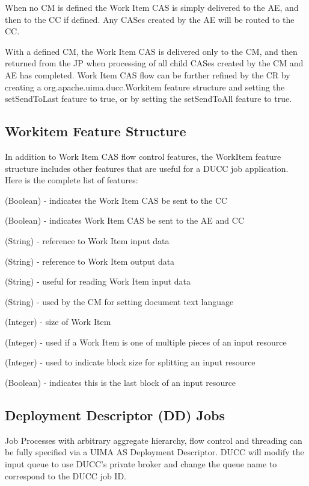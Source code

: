 When no CM is defined the Work Item CAS is simply delivered to the AE, and then to the CC if defined. 
Any CASes created by the AE will be routed to the CC.

With a defined CM, the Work Item CAS is delivered only to the CM, and then returned from the JP when processing
of all child CASes created by the CM and AE has completed. Work Item CAS flow can be further refined by the CR by
creating a org.apache.uima.ducc.Workitem feature structure and setting the setSendToLast feature to true,
or by setting the setSendToAll feature to true.

\subsection{Workitem Feature Structure}
In addition to Work Item CAS flow control features, the WorkItem feature structure includes other features that are useful
for a DUCC job application. Here is the complete list of features:

\begin{description}[labelindent=0.5in,leftmargin=0.5in]
  \item[sendToLast] (Boolean) - indicates the Work Item CAS be sent to the CC
  \item[sendToAll] (Boolean) - indicates Work Item CAS be sent to the AE and CC
  \item[inputspec] (String) - reference to Work Item input data
  \item[outputspec] (String) - reference to Work Item output data
  \item[encoding] (String) - useful for reading Work Item input data
  \item[language] (String) - used by the CM for setting document text language
  \item[bytelength] (Integer) - size of Work Item
  \item[blockindex] (Integer) - used if a Work Item is one of multiple pieces of an input resource
  \item[blocksize] (Integer) - used to indicate block size for splitting an input resource
  \item[lastBlock] (Boolean) - indicates this is the last block of an input resource
\end{description}

\subsection{Deployment Descriptor (DD) Jobs}
Job Processes with arbitrary aggregate hierarchy, flow control and threading can be fully specified
via a UIMA AS Deployment Descriptor. DUCC will modify the input queue to use DUCC's private
broker and change the queue name to correspond to the DUCC job ID.

